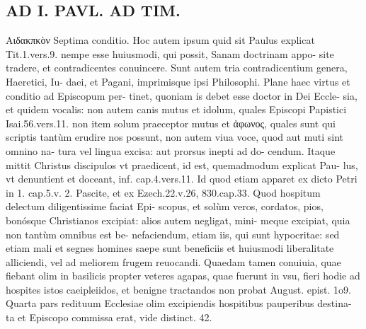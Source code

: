 \documentclass{article}
\begin{document}
\begin{pages}
\section*{AD I. PAVL. AD TIM. }
\marginpar{[ p.126 ]}\pstart Αιδακπκὸν Septima conditio. Hoc autem ipsum quid sit Paulus explicat Tit.1.vers.9. nempe esse huiusmodi, qui possit, Sanam doctrinam appo- site tradere, et contradicentes conuincere. Sunt autem tria contradicentium genera, Haeretici, Iu- daei, et Pagani, imprimisque ipsi Philosophi. Plane haec virtus et conditio ad Episcopum per- tinet, quoniam is debet esse doctor in Dei Eccle- sia, et quidem vocalis: non autem canis mutus et idolum, quales Episcopi Papistici Isai.56.vers.11. non item solum praeceptor mutus et ἀφωνος, quales sunt qui scriptis tantùm erudire nos possunt, non autem viua voce, quod aut muti sint omnino na- tura vel lingua excisa: aut prorsus inepti ad do- cendum. Itaque mittit Christus discipulos vt praedicent, id est, quemadmodum explicat Pau- lus, vt denuntient et doceant, inf. cap.4.vers.11. Id quod etiam apparet ex dicto Petri in 1. cap.5.v. 2. Pascite, et ex Ezech.22.v.26, 830.cap.33. Quod  \pend\pstart hospitum delectum diligentissime faciat Epi- scopus, et solùm veros, cordatos, pios, bonósque Christianos excipiat: alios autem negligat, mini- meque  excipiat, quia non tantùm omnibus est be- nefaciendum, etiam iis, qui sunt hypocritae: sed etiam mali et segnes homines saepe sunt beneficiis et huiusmodi liberalitate alliciendi, vel ad meliorem frugem reuocandi. Quaedam tamen conuiuia, quae fiebant olim in basilicis propter veteres agapas, quae fuerunt in vsu, fieri hodie ad hospites istos caeipleiidos, et benigne tractandos non probat August. epist. 1o9. Quarta pars redituum Ecclesiae olim excipiendis hospitibus pauperibus destina- ta et Episcopo commissa erat, vide distinct. 42.  \pend

\end{pages}
\end{document}
